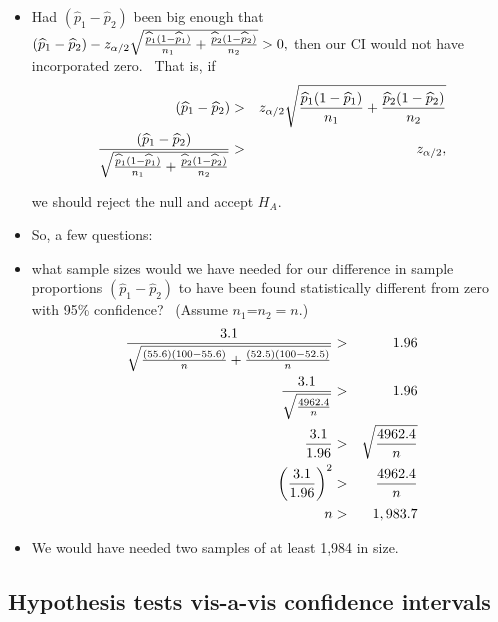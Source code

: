 \documentclass[11pt]{article}
\begin{document}
\begin{itemize}
\begin{itemize}
\begin{itemize}
\item Had $\left( \widehat{p}_{1}-\widehat{p}_{2}\right) $ been big enough
that $\left( \widehat{p}_{1}-\widehat{p}_{2}\right) -z_{\alpha /2}\sqrt{%
\frac{\widehat{p}_{1}(1-\widehat{p}_{1})}{n_{1}}+\frac{\widehat{p}_{2}(1-%
\widehat{p}_{2})}{n_{2}}}>0,$ then our CI would not have incorporated zero.
\ That is, if 
\begin{eqnarray*}
\left( \widehat{p}_{1}-\widehat{p}_{2}\right) &>&z_{\alpha /2}\sqrt{\frac{%
\widehat{p}_{1}(1-\widehat{p}_{1})}{n_{1}}+\frac{\widehat{p}_{2}(1-\widehat{p%
}_{2})}{n_{2}}} \\
\frac{\left( \widehat{p}_{1}-\widehat{p}_{2}\right) }{\sqrt{\frac{\widehat{p}%
_{1}(1-\widehat{p}_{1})}{n_{1}}+\frac{\widehat{p}_{2}(1-\widehat{p}_{2})}{%
n_{2}}}} &>&z_{\alpha /2},
\end{eqnarray*}

we should reject the null and accept $H_{A}$.

\item So, a few questions:

\item what sample sizes would we have needed for our difference in sample
proportions $(\widehat{p}_{1}-\widehat{p}_{2})$ to have been found
statistically different from zero with 95\% confidence? \ (Assume $n_{1}$=$%
n_{2}=n$.)%
\begin{eqnarray*}
\frac{3.1}{\sqrt{\frac{\left( 55.6\right) \left( 100-55.6\right) }{n}+\frac{%
(52.5)(100-52.5)}{n}}} &>&1.96 \\
\frac{3.1}{\sqrt{\frac{4962.4}{n}}} &>&1.96 \\
\frac{3.1}{1.96} &>&\sqrt{\frac{4962.4}{n}} \\
\left( \frac{3.1}{1.96}\right) ^{2} &>&\frac{4962.4}{n} \\
n &>&1,983.7
\end{eqnarray*}

\item We would have needed two samples of at least 1,984 in size.
\end{itemize}
\end{itemize}
\end{itemize}

\subsection{Hypothesis tests vis-a-vis confidence intervals}
\end{document}
